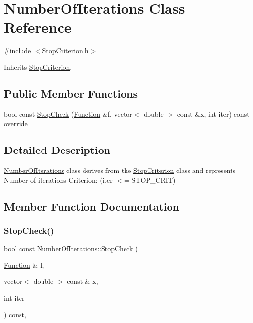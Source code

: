 \hypertarget{class_number_of_iterations}{}\section{Number\+Of\+Iterations Class Reference}
\label{class_number_of_iterations}


{\ttfamily \#include $<$Stop\+Criterion.\+h$>$}



Inherits \hyperlink{class_stop_criterion}{Stop\+Criterion}.

\subsection*{Public Member Functions}
\begin{DoxyCompactItemize}
\item 
bool const \hyperlink{class_number_of_iterations_a15003e19b5a35092fd4d068d06d41659}{Stop\+Check} (\hyperlink{class_function}{Function} \&f, vector$<$ double $>$ const \&x, int iter) const override
\end{DoxyCompactItemize}


\subsection{Detailed Description}
\hyperlink{class_number_of_iterations}{Number\+Of\+Iterations} class derives from the \hyperlink{class_stop_criterion}{Stop\+Criterion} class and represents Number of iterations Criterion\+: (iter $<$= S\+T\+O\+P\+\_\+\+C\+R\+IT) 

\subsection{Member Function Documentation}
\mbox{\label{class_number_of_iterations_a15003e19b5a35092fd4d068d06d41659}} 
\subsubsection{\texorpdfstring{Stop\+Check()}{StopCheck()}}
{\footnotesize\ttfamily bool const Number\+Of\+Iterations\+::\+Stop\+Check (\begin{DoxyParamCaption}\item[{\hyperlink{class_function}{Function} \&}]{f,  }\item[{vector$<$ double $>$ const \&}]{x,  }\item[{int}]{iter }\end{DoxyParamCaption}) const\hspace{0.3cm}{\ttfamily [override]}, {\ttfamily [virtual]}}

